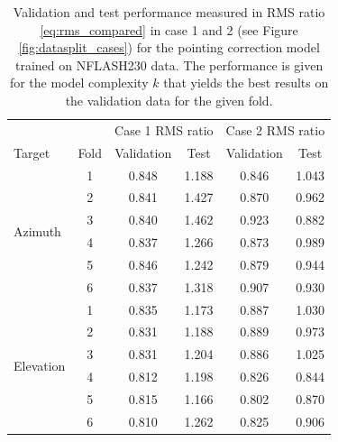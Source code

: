 \begin{table}[!htbp]
    \centering
    \caption[NFLASH230 pointing correction model results on each fold]{
    Validation and test performance measured in RMS ratio \eqref{eq:rms_compared} in case 1 and 2 (see Figure \ref{fig:datasplit_cases}) for the pointing correction model trained on NFLASH230 data.
    The performance is given for the model complexity $k$ that yields the best results on the validation data for the given fold.}
    \begin{tabular}{lccccc}
        \toprule
        & & \multicolumn{2}{c}{Case 1 RMS ratio} & \multicolumn{2}{c}{Case 2 RMS ratio} \\
        \cmidrule{3-4} \cmidrule{5-6}
        Target & Fold & Validation & Test &  Validation &  Test \\
        \midrule
        \multirow{6}{*}{Azimuth} & 1 &  0.848 &       1.188 &      0.846 &       1.043 \\
                            & 2 &  0.841 &       1.427 &      0.870 &       0.962 \\
                            & 3 &  0.840 &       1.462 &      0.923 &       0.882 \\
                            & 4 &  0.837 &       1.266 &      0.873 &       0.989 \\
                            & 5 &  0.846 &       1.242 &      0.879 &       0.944 \\
                            & 6 &  0.837 &       1.318 &      0.907 &       0.930 \\
        \hline
        \multirow{6}{*}{Elevation} & 1 &  0.835 &       1.173 &      0.887 &       1.030 \\
                            & 2 &  0.831 &       1.188 &      0.889 &       0.973 \\
                            & 3 &  0.831 &       1.204 &      0.886 &       1.025 \\
                            & 4 &  0.812 &       1.198 &      0.826 &       0.844 \\
                            & 5 &  0.815 &       1.166 &      0.802 &       0.870 \\
                            & 6 &  0.810 &       1.262 &      0.825 &       0.906 \\
        \bottomrule
    \end{tabular}
    \label{tab:results_minval_val_test_days_04_n230}
\end{table}

